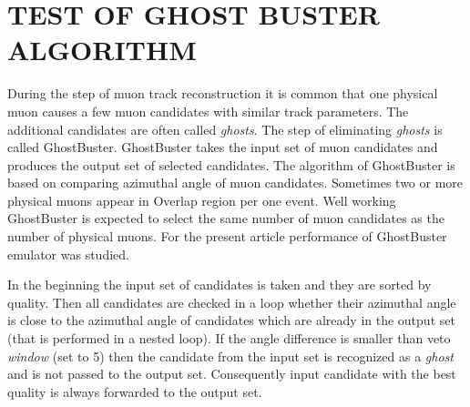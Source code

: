 \section{TEST OF GHOST BUSTER ALGORITHM}

During the step of muon track reconstruction it is common that one physical muon causes a few muon candidates with similar track parameters. The additional candidates are often called \textit{ghosts}. The step of eliminating \textit{ghosts} is called GhostBuster. GhostBuster takes the input set of muon candidates and produces the output set of selected candidates. The algorithm of GhostBuster is based on comparing azimuthal angle of muon candidates. Sometimes two or more physical muons appear in Overlap region per one event. Well working GhostBuster is expected to select the same number of muon candidates as the number of physical muons. For the present article performance of GhostBuster emulator was studied.

In the beginning the input set of candidates is taken and they are sorted by quality. Then all candidates are checked in a loop whether their azimuthal angle is close to the azimuthal angle of candidates which are already in the output set (that is performed in a nested loop). If the angle difference is smaller than veto \textit{window} (set to 5\textdegree) then the candidate from the input set is recognized as a \textit{ghost} and is not passed to the output set. Consequently input candidate with the best quality is always forwarded to the output set.


